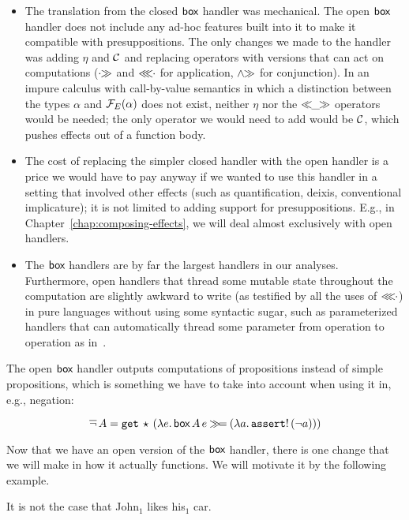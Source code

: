 \begin{itemize}
\item The translation from the closed $\textsf{box}$ handler was mechanical. The
  open $\textsf{box}$ handler does not include any ad-hoc features built into it to
  make it compatible with presuppositions. The only changes we made to the
  handler was adding $\eta$ and $\mathcal{C}$ and replacing operators with versions
  that can act on computations ($\mathbin{\cdot\!\!\gg}$ and $\mathbin{\lll\!\!\cdot}$ for application, $\mathbin{\land\!\!\gg}$
  for conjunction). In an impure calculus with call-by-value semantics in
  which a distinction between the types $\alpha$ and $\mathcal{F}_E(\alpha)$ does
  not exist, neither $\eta$ nor the $\mathbin{\ll\!\!\_\!\!\gg}$ operators would be needed;
  the only operator we would need to add would be $\mathcal{C}$, which pushes
  effects out of a function body.
\item The cost of replacing the simpler closed handler with the open
  handler is a price we would have to pay anyway if we wanted to use this
  handler in a setting that involved other effects (such as quantification,
  deixis, conventional implicature); it is not limited to adding support
  for presuppositions. E.g., in Chapter~\ref{chap:composing-effects}, we
  will deal almost exclusively with open handlers.
\item The $\textsf{box}$ handlers are by far the largest handlers in our
  analyses. Furthermore, open handlers that thread some mutable state
  throughout the computation are slightly awkward to write (as testified by
  all the uses of $\mathbin{\lll\!\!\cdot}$) in pure languages without using some syntactic
  sugar, such as parameterized handlers that can automatically thread some
  parameter from operation to operation as
  in~\cite{kammar2013handlers,kiselyov2015freer}.
\end{itemize}

The open $\textsf{box}$ handler outputs computations of propositions instead of
simple propositions, which is something we have to take into account when
using it in, e.g., negation:

$$
\mathop{\overline{\lnot}} A = \mathtt{get}\,\star\,(\lambda e.\, \textsf{box}\,A\,e \mathbin{\gg\!=} (\lambda a.\, \mathtt{assert}!\,(\lnot a)))
$$

Now that we have an open version of the $\textsf{box}$ handler, there is one change
that we will make in how it actually functions. We will motivate it by the
following example.

\begin{exe}
  \ex \label{ex:not-john-car} It is not the case that John$_1$ likes his$_1$ car.
\end{exe}

